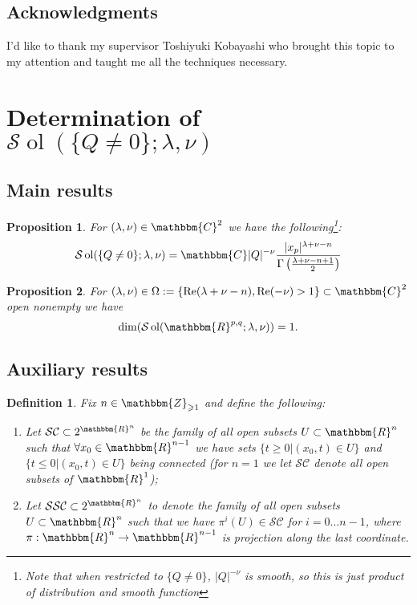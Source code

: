 \documentclass{article}
\newcommand{\assign}{:=}
\newcommand{\tmop}[1]{\ensuremath{\operatorname{#1}}}
\newtheorem{definition}{Definition}
\numberwithin{definition}{section}
\numberwithin{lemma}{section}
\newtheorem{proposition}{Proposition}
\numberwithin{proposition}{section}
{\theorembodyfont{\rmfamily}\newtheorem{remark}{Remark}
\numberwithin{remark}{section}
}
\begin{document}
\subsection{Acknowledgments}

I'd like to thank my supervisor Toshiyuki Kobayashi who brought this topic to
my attention and taught me all the techniques necessary.

\section{Determination of $\mathcal{S} \tmop{ol} ( \{ Q \neq 0 \} ; \lambda,
\nu)$}\label{sec:lem67}

\subsection{Main results}

\begin{proposition}
  \label{lem67:prop-67}For $( \lambda, \nu) \in \mathbbm{C}^2$ we have the
  following{\footnote{Note that when restricted to $\{ Q \neq 0 \}$, $| Q |^{-
  \nu}$ is smooth, so this is just product of distribution and smooth
  function}}:
  \[ \mathcal{S} \tmop{ol} ( \{ Q \neq 0 \} ; \lambda, \nu) =\mathbbm{C} | Q
     |^{- \nu} \frac{| x_p |^{\lambda + \nu - n}}{\Gamma \left( \frac{\lambda
     + \nu - n + 1}{2} \right)} \]
\end{proposition}

\begin{proposition}
  \label{lem67:prop-dim1}For $( \lambda, \nu) \in \Omega \assign \{ \tmop{Re}
  ( \lambda + \nu - n), \tmop{Re} ( - \nu) > 1 \} \subset \mathbbm{C}^2$ open
  nonempty we have
  \[ \dim ( \mathcal{S} \tmop{ol} ( \mathbbm{R}^{p, q} ; \lambda, \nu)) = 1.
  \]
\end{proposition}

\subsection{Auxiliary results}

\begin{definition}
  Fix $n \in \mathbbm{Z}_{\geqslant 1}$ and define the following:
  \begin{enumerate}
    \item Let $\mathcal{S}\mathcal{C} \subset 2^{\mathbbm{R}^n}$ be the family
    of all open subsets $U \subset \mathbbm{R}^n$ such that $\forall x_0 \in
    \mathbbm{R}^{n - 1}$ we have sets $\{ t \geqslant 0 | ( x_0, t) \in U \}$
    and $\{ t \leqslant 0 | ( x_0, t) \in U \}$ being connected (for $n = 1$
    we let $\mathcal{S}\mathcal{C}$ denote all open subsets of
    $\mathbbm{R}^1$);
    
    \item Let $\mathcal{S}\mathcal{S}\mathcal{C} \subset 2^{\mathbbm{R}^n}$ to
    denote the family of all open subsets $U \subset \mathbbm{R}^n$ such that
    we have $\pi^i ( U) \in \mathcal{S}\mathcal{C}$ for $i = 0 \ldots n - 1$,
    where $\pi : \mathbbm{R}^n \rightarrow \mathbbm{R}^{n - 1}$ is projection
    along the last coordinate.
  \end{enumerate}
\end{definition}
\end{document}
